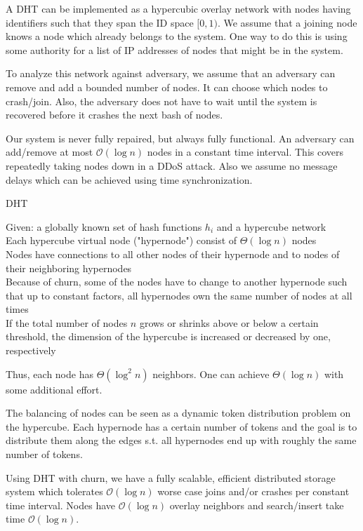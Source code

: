 A DHT can be implemented as a hypercubic overlay network with nodes having identifiers such that they span the ID space $[0, 1)$. We assume that a joining node knows a node which already belongs to the system. One way to do this is using some authority for a list of IP addresses of nodes that might be in the system. \medskip

To analyze this network against adversary, we assume that an adversary can remove and add a bounded number of nodes. It can choose which nodes to crash/join. Also, the adversary does not have to wait until the system is recovered before it crashes the next bash of nodes. \medskip

Our system is never fully repaired, but always fully functional. An adversary can add/remove at most $\mathcal O (\log n)$ nodes in a constant time interval. This covers repeatedly taking nodes down in a DDoS attack. Also we assume no message delays which can be achieved using time synchronization.\medskip

\begin{algorithm}[H]
\caption{DHT}
	Given: a globally known set of hash functions $h_i$ and a hypercube network \\
	Each hypercube virtual node ("hypernode") consist of $\Theta(\log n)$ nodes \\
	Nodes have connections to all other nodes of their hypernode and to nodes of their neighboring hypernodes \\
	Because of churn, some of the nodes have to change to another hypernode such that up to constant factors, all hypernodes own the same number of nodes at all times \\
	If the total number of nodes $n$ grows or shrinks above or below a certain threshold, the dimension of the hypercube is increased or decreased by one, respectively
\end{algorithm}
\medskip

Thus, each node has $\Theta(\log^2 n)$ neighbors. One can achieve $\Theta (\log n)$ with some additional effort. \medskip

The balancing of nodes can be seen as a dynamic token distribution problem on the hypercube. Each hypernode has a certain number of tokens and the goal is to distribute them along the edges s.t. all hypernodes end up with roughly the same number of tokens. \medskip

Using DHT with churn, we have a fully scalable, efficient distributed storage system which tolerates $\mathcal O(\log n)$ worse case joins and/or crashes per constant time interval. Nodes have $\mathcal O (\log n)$ overlay neighbors and search/insert take time $\mathcal O (\log n)$.


